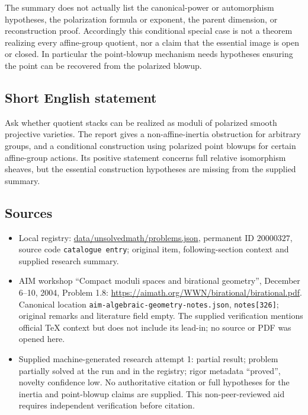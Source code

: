 \documentclass[11pt]{article}
\begin{document}
The summary does not actually list the canonical-power or automorphism hypotheses, the polarization formula or exponent, the parent dimension, or reconstruction proof. Accordingly this conditional special case is not a theorem realizing every affine-group quotient, nor a claim that the essential image is open or closed. In particular the point-blowup mechanism needs hypotheses ensuring the point can be recovered from the polarized blowup.
\subsection{Short English statement}
Ask whether quotient stacks can be realized as moduli of polarized smooth projective varieties. The report gives a non-affine-inertia obstruction for arbitrary groups, and a conditional construction using polarized point blowups for certain affine-group actions. Its positive statement concerns full relative isomorphism sheaves, but the essential construction hypotheses are missing from the supplied summary.
\subsection{Sources}
\begin{itemize}
\item Local registry: \url{data/unsolvedmath/problems.json}, permanent ID $20000327$, source code \texttt{catalogue entry}; original item, following-section context and supplied research summary.
\item AIM workshop ``Compact moduli spaces and birational geometry'', December 6--10, 2004, Problem 1.8: \url{https://aimath.org/WWN/birational/birational.pdf}. Canonical location \texttt{aim-algebraic-geometry-notes.json}, \texttt{notes[326]}; original remarks and literature field empty. The supplied verification mentions official TeX context but does not include its lead-in; no source or PDF was opened here.
\item Supplied machine-generated research attempt 1: partial result; problem partially solved at the run and in the registry; rigor metadata ``proved'', novelty confidence low. No authoritative citation or full hypotheses for the inertia and point-blowup claims are supplied. This non-peer-reviewed aid requires independent verification before citation.
\end{itemize}
\end{document}

